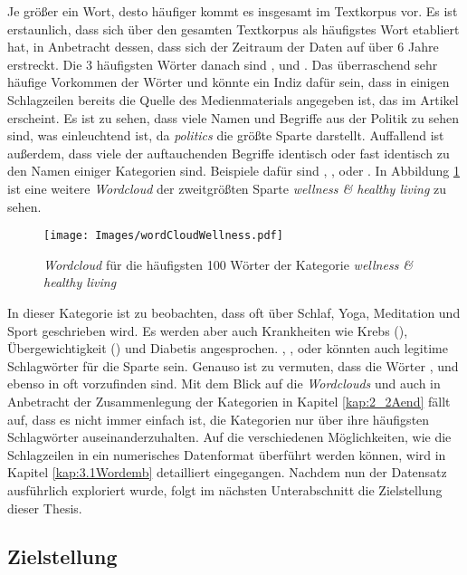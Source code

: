 \documentclass[a4paper,11pt]{article}
\begin{document}
Je größer ein Wort, desto häufiger kommt es insgesamt im Textkorpus vor. Es ist erstaunlich, dass  sich über den gesamten Textkorpus als häufigstes Wort etabliert hat, in Anbetracht dessen, dass sich der Zeitraum der Daten auf über $6$ Jahre erstreckt. Die $3$ häufigsten Wörter danach sind ,  und . Das überraschend sehr häufige Vorkommen der Wörter  und  könnte ein Indiz dafür sein, dass in einigen Schlagzeilen bereits die Quelle des Medienmaterials angegeben ist, das im Artikel erscheint. Es ist zu sehen, dass viele Namen und Begriffe aus der Politik zu sehen sind, was einleuchtend ist, da \textit{politics} die größte Sparte darstellt. 
Auffallend ist außerdem, dass viele der auftauchenden Begriffe identisch oder fast identisch zu den Namen einiger Kategorien sind. Beispiele dafür sind , ,  oder . In Abbildung \ref{abb:WordcloudWellness} ist eine weitere \textit{Wordcloud} der zweitgrößten Sparte \textit{wellness \& healthy living} zu sehen.

\begin{figure}[ht]
    \centering
\texttt{[image: Images/wordCloudWellness.pdf]} 
\caption{\textit{Wordcloud} für die häufigsten 100 Wörter der Kategorie \textit{wellness \& healthy living}}
\label{abb:WordcloudWellness}
\end{figure}

In dieser Kategorie ist zu beobachten, dass oft über Schlaf, Yoga, Meditation und Sport geschrieben wird. Es werden aber auch Krankheiten wie Krebs (), Übergewichtigkeit () und Diabetis angesprochen. , ,  oder  könnten auch legitime Schlagwörter für die  Sparte sein. Genauso ist zu vermuten, dass die Wörter ,  und  ebenso in  oft vorzufinden sind. Mit dem Blick auf die \textit{Wordclouds} und auch in Anbetracht der Zusammenlegung der Kategorien in Kapitel \ref{kap:2_2Aend} fällt auf, dass es nicht immer einfach ist, die Kategorien nur über ihre häufigsten Schlagwörter auseinanderzuhalten. Auf die verschiedenen Möglichkeiten, wie die Schlagzeilen in ein numerisches Datenformat überführt werden können, wird in Kapitel \ref{kap:3.1Wordemb} detailliert eingegangen.
Nachdem nun der Datensatz ausführlich exploriert wurde, folgt im nächsten Unterabschnitt die Zielstellung dieser Thesis.


\subsection{Zielstellung} \label{Kap:Zielst}
\end{document}

